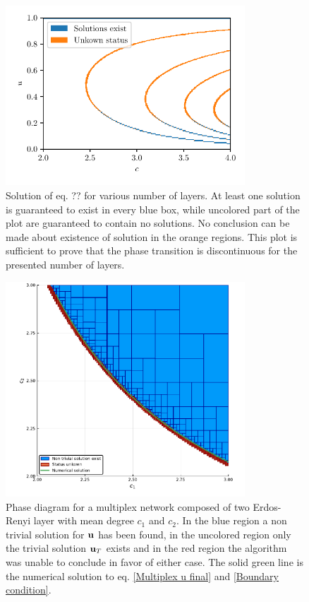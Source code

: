 \documentclass[
11pt, %
english, %
singlespacing, %
nolistspacing, %
liststotoc, %
headsepline, %
]{MastersDoctoralThesis} %
\begin{document}
\begin{figure}
	\includegraphics[width=0.8\textwidth]{multilayer_single_param_ErdosRenyiGraph.pdf}
	\caption{Solution of eq. ?? for various number of layers. At least one solution is guaranteed to exist in every blue box, while uncolored part of the plot are guaranteed to contain no solutions. No conclusion can be made about existence of solution in the orange regions. This plot is sufficient to prove that the phase transition is discontinuous for the presented number of layers.}
	\label{Figure: Multilayer single parameter ER}
\end{figure}

\begin{figure}
	\includegraphics[width=0.8\textwidth]{two_layers_erdos_renyi_boundary.pdf}
	\caption{Phase diagram for a multiplex network composed of two Erdos-Renyi layer with mean degree $c_1$ and $c_2$. In the blue region a non trivial solution for $\boldsymbol{\mathrm{u}}$ has been found, in the uncolored region only the trivial solution $\boldsymbol{\mathrm{u}}_T$ exists and in the red region the algorithm was unable to conclude in favor of either case. The solid green line is the numerical solution to eq. \eqref{Multiplex u final} and \eqref{Boundary condition}.}
	\label{Figure: Regions and boundary}
\end{figure}
\end{document}
